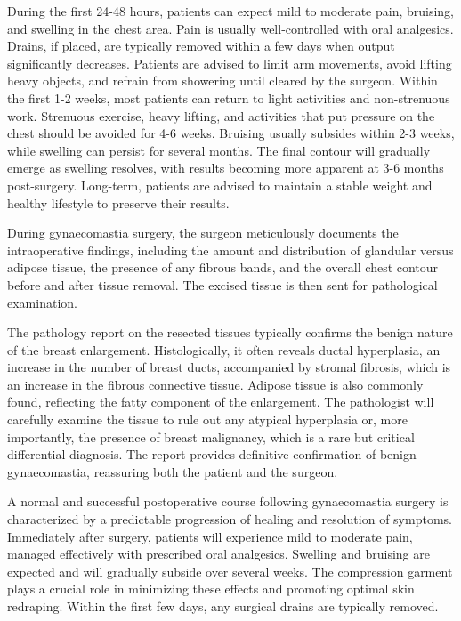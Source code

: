 During the first 24-48 hours, patients can expect mild to moderate pain, bruising, and swelling in the chest area. Pain is usually well-controlled with oral analgesics. Drains, if placed, are typically removed within a few days when output significantly decreases. Patients are advised to limit arm movements, avoid lifting heavy objects, and refrain from showering until cleared by the surgeon. Within the first 1-2 weeks, most patients can return to light activities and non-strenuous work. Strenuous exercise, heavy lifting, and activities that put pressure on the chest should be avoided for 4-6 weeks. Bruising usually subsides within 2-3 weeks, while swelling can persist for several months. The final contour will gradually emerge as swelling resolves, with results becoming more apparent at 3-6 months post-surgery. Long-term, patients are advised to maintain a stable weight and healthy lifestyle to preserve their results.

During gynaecomastia surgery, the surgeon meticulously documents the intraoperative findings, including the amount and distribution of glandular versus adipose tissue, the presence of any fibrous bands, and the overall chest contour before and after tissue removal. The excised tissue is then sent for pathological examination.

The pathology report on the resected tissues typically confirms the benign nature of the breast enlargement. Histologically, it often reveals ductal hyperplasia, an increase in the number of breast ducts, accompanied by stromal fibrosis, which is an increase in the fibrous connective tissue. Adipose tissue is also commonly found, reflecting the fatty component of the enlargement. The pathologist will carefully examine the tissue to rule out any atypical hyperplasia or, more importantly, the presence of breast malignancy, which is a rare but critical differential diagnosis. The report provides definitive confirmation of benign gynaecomastia, reassuring both the patient and the surgeon.

A normal and successful postoperative course following gynaecomastia surgery is characterized by a predictable progression of healing and resolution of symptoms. Immediately after surgery, patients will experience mild to moderate pain, managed effectively with prescribed oral analgesics. Swelling and bruising are expected and will gradually subside over several weeks. The compression garment plays a crucial role in minimizing these effects and promoting optimal skin redraping. Within the first few days, any surgical drains are typically removed.

